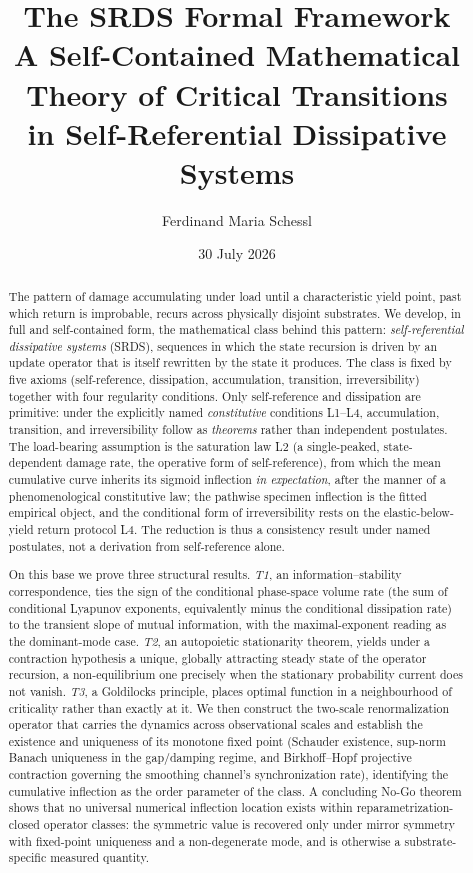 \documentclass[11pt]{article}
\title{\textbf{The SRDS Formal Framework}\\[0.3em]
\large A Self-Contained Mathematical Theory of Critical Transitions\\ in Self-Referential Dissipative Systems}
\author{Ferdinand Maria Schessl}
\date{30 July 2026}
\theoremstyle{plain}
\theoremstyle{definition}
\theoremstyle{remark}
\begin{document}
\maketitle

\begin{abstract}
The pattern of damage accumulating under load until a characteristic yield point, past which return is improbable, recurs across physically disjoint substrates. We develop, in full and self-contained form, the mathematical class behind this pattern: \emph{self-referential dissipative systems} (SRDS), sequences in which the state recursion is driven by an update operator that is itself rewritten by the state it produces. The class is fixed by five axioms (self-reference, dissipation, accumulation, transition, irreversibility) together with four regularity conditions. Only self-reference and dissipation are primitive: under the explicitly named \emph{constitutive} conditions L1--L4, accumulation, transition, and irreversibility follow as \emph{theorems} rather than independent postulates. The load-bearing assumption is the saturation law L2 (a single-peaked, state-dependent damage rate, the operative form of self-reference), from which the mean cumulative curve inherits its sigmoid inflection \emph{in expectation}, after the manner of a phenomenological constitutive law; the pathwise specimen inflection is the fitted empirical object, and the conditional form of irreversibility rests on the elastic-below-yield return protocol L4. The reduction is thus a consistency result under named postulates, not a derivation from self-reference alone.

On this base we prove three structural results. \emph{T1}, an information--stability correspondence, ties the sign of the conditional phase-space volume rate (the sum of conditional Lyapunov exponents, equivalently minus the conditional dissipation rate) to the transient slope of mutual information, with the maximal-exponent reading as the dominant-mode case. \emph{T2}, an autopoietic stationarity theorem, yields under a contraction hypothesis a unique, globally attracting steady state of the operator recursion, a non-equilibrium one precisely when the stationary probability current does not vanish. \emph{T3}, a Goldilocks principle, places optimal function in a neighbourhood of criticality rather than exactly at it. We then construct the two-scale renormalization operator that carries the dynamics across observational scales and establish the existence and uniqueness of its monotone fixed point (Schauder existence, sup-norm Banach uniqueness in the gap/damping regime, and Birkhoff--Hopf projective contraction governing the smoothing channel's synchronization rate), identifying the cumulative inflection as the order parameter of the class. A concluding No-Go theorem shows that no universal numerical inflection location exists within reparametrization-closed operator classes: the symmetric value is recovered only under mirror symmetry with fixed-point uniqueness and a non-degenerate mode, and is otherwise a substrate-specific measured quantity.


\end{abstract}
\end{document}

